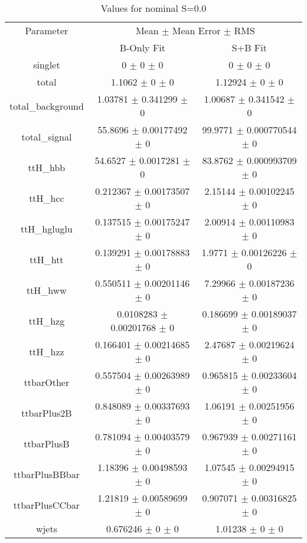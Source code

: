 \begin{table}
\centering
\caption{Values for nominal S=0.0}
\begin{tabular}{ccc}
\toprule
Parameter & \multicolumn{2}{c}{Mean $\pm$ Mean Error $\pm$ RMS}\\
 & B-Only Fit & S+B Fit\\
\midrule
singlet & \num{0} $\pm$ \num{0} $\pm$ \num{0} & \num{0} $\pm$ \num{0} $\pm$ \num{0}\\
total & \num{1.1062} $\pm$ \num{0} $\pm$ \num{0} & \num{1.12924} $\pm$ \num{0} $\pm$ \num{0}\\
total\_background & \num{1.03781} $\pm$ \num{0.341299} $\pm$ \num{0} & \num{1.00687} $\pm$ \num{0.341542} $\pm$ \num{0}\\
total\_signal & \num{55.8696} $\pm$ \num{0.00177492} $\pm$ \num{0} & \num{99.9771} $\pm$ \num{0.000770544} $\pm$ \num{0}\\
ttH\_hbb & \num{54.6527} $\pm$ \num{0.0017281} $\pm$ \num{0} & \num{83.8762} $\pm$ \num{0.000993709} $\pm$ \num{0}\\
ttH\_hcc & \num{0.212367} $\pm$ \num{0.00173507} $\pm$ \num{0} & \num{2.15144} $\pm$ \num{0.00102245} $\pm$ \num{0}\\
ttH\_hgluglu & \num{0.137515} $\pm$ \num{0.00175247} $\pm$ \num{0} & \num{2.00914} $\pm$ \num{0.00110983} $\pm$ \num{0}\\
ttH\_htt & \num{0.139291} $\pm$ \num{0.00178883} $\pm$ \num{0} & \num{1.9771} $\pm$ \num{0.00126226} $\pm$ \num{0}\\
ttH\_hww & \num{0.550511} $\pm$ \num{0.00201146} $\pm$ \num{0} & \num{7.29966} $\pm$ \num{0.00187236} $\pm$ \num{0}\\
ttH\_hzg & \num{0.0108283} $\pm$ \num{0.00201768} $\pm$ \num{0} & \num{0.186699} $\pm$ \num{0.00189037} $\pm$ \num{0}\\
ttH\_hzz & \num{0.166401} $\pm$ \num{0.00214685} $\pm$ \num{0} & \num{2.47687} $\pm$ \num{0.00219624} $\pm$ \num{0}\\
ttbarOther & \num{0.557504} $\pm$ \num{0.00263989} $\pm$ \num{0} & \num{0.965815} $\pm$ \num{0.00233604} $\pm$ \num{0}\\
ttbarPlus2B & \num{0.848089} $\pm$ \num{0.00337693} $\pm$ \num{0} & \num{1.06191} $\pm$ \num{0.00251956} $\pm$ \num{0}\\
ttbarPlusB & \num{0.781094} $\pm$ \num{0.00403579} $\pm$ \num{0} & \num{0.967939} $\pm$ \num{0.00271161} $\pm$ \num{0}\\
ttbarPlusBBbar & \num{1.18396} $\pm$ \num{0.00498593} $\pm$ \num{0} & \num{1.07545} $\pm$ \num{0.00294915} $\pm$ \num{0}\\
ttbarPlusCCbar & \num{1.21819} $\pm$ \num{0.00589699} $\pm$ \num{0} & \num{0.907071} $\pm$ \num{0.00316825} $\pm$ \num{0}\\
wjets & \num{0.676246} $\pm$ \num{0} $\pm$ \num{0} & \num{1.01238} $\pm$ \num{0} $\pm$ \num{0}\\
\bottomrule
\end{tabular}
\end{table}